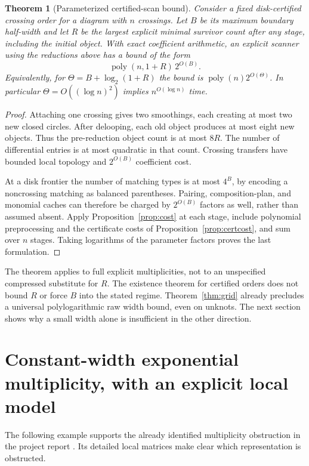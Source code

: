 \documentclass[11pt]{article}
\newtheorem{theorem}{Theorem}[section]
\theoremstyle{definition}\newtheorem{definition}[theorem]{Definition}
\theoremstyle{remark}\newtheorem{remark}[theorem]{Remark}
\begin{document}
\begin{theorem}[Parameterized certified-scan bound]\label{thm:qp}
Consider a fixed disk-certified crossing order for a diagram with $n$ crossings.
Let $B$ be its maximum boundary half-width and let $R$ be the largest explicit
minimal survivor count after any stage, including the initial object. With exact
coefficient arithmetic, an explicit scanner using the reductions above has a
bound of the form
\begin{equation}\label{eq:globalcost}
 \operatorname{poly}(n,1+R)\,2^{O(B)}.
\end{equation}
Equivalently, for $\Theta=B+\log_2(1+R)$ the bound is
$\operatorname{poly}(n)2^{O(\Theta)}$. In particular
$\Theta=O((\log n)^2)$ implies $n^{O(\log n)}$ time.
\end{theorem}
\begin{proof}
Attaching one crossing gives two smoothings, each creating at most two new closed
circles. After delooping, each old object produces at most eight new objects.
Thus the pre-reduction object count is at most $8R$. The number of differential
entries is at most quadratic in that count. Crossing transfers have bounded
local topology and $2^{O(B)}$ coefficient cost.

At a disk frontier the number of matching types is at most $4^B$, by encoding a
noncrossing matching as balanced parentheses. Pairing, composition-plan, and
monomial caches can therefore be charged by $2^{O(B)}$ factors as well, rather
than assumed absent. Apply Proposition~\ref{prop:cost} at each stage, include
polynomial preprocessing and the certificate costs of Proposition~\ref{prop:certcost},
and sum over $n$ stages. Taking logarithms of the parameter factors proves the
last formulation.
\end{proof}

The theorem applies to full explicit multiplicities, not to an unspecified
compressed substitute for $R$. The existence theorem for certified orders does
not bound $R$ or force $B$ into the stated regime. Theorem~\ref{thm:grid} already
precludes a universal polylogarithmic raw width bound, even on unknots. The next
section shows why a small width alone is insufficient in the other direction.

\section{Constant-width exponential multiplicity, with an explicit local model}
\label{sec:trefoil}
The following example supports the already identified multiplicity obstruction
in the project report \cite{RepoRadical}. Its detailed local matrices make clear
which representation is obstructed.
\end{document}
